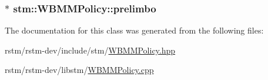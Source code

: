 \hypertarget{classstm_1_1WBMMPolicy_a78b17de0b63e9b212d112c90da9694de}{
\subsubsection[{prelimbo}]{$\ast$ stm\-::\-W\-B\-M\-M\-Policy\-::prelimbo\hspace{0.3cm}{\ttfamily [private]}}}\label{classstm_1_1WBMMPolicy_a78b17de0b63e9b212d112c90da9694de}


The documentation for this class was generated from the following files\-:\begin{DoxyCompactItemize}
\item 
rstm/rstm-\/dev/include/stm/\hyperlink{WBMMPolicy_8hpp}{W\-B\-M\-M\-Policy.\-hpp}\item 
rstm/rstm-\/dev/libstm/\hyperlink{WBMMPolicy_8cpp}{W\-B\-M\-M\-Policy.\-cpp}\end{DoxyCompactItemize}
